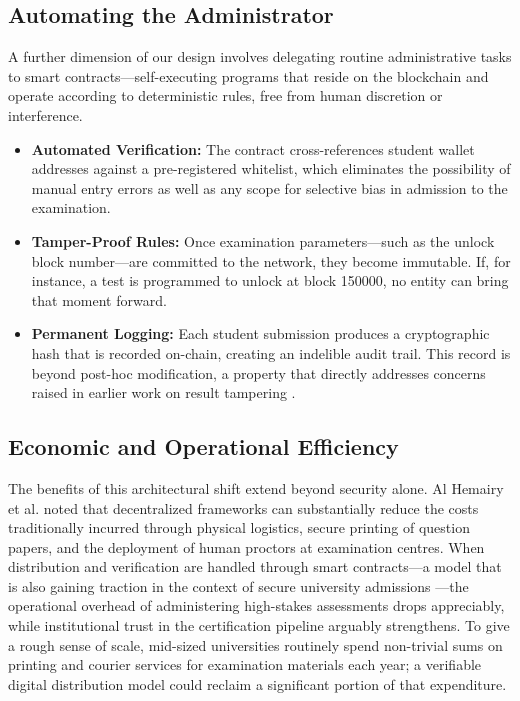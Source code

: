 \documentclass[final,5p,times]{elsarticle}
\begin{document}
\subsection{Automating the Administrator}
A further dimension of our design involves delegating routine administrative tasks to smart contracts—self-executing programs that reside on the blockchain and operate according to deterministic rules, free from human discretion or interference.
\begin{itemize}
    \item \textbf{Automated Verification:} The contract cross-references student wallet addresses against a pre-registered whitelist, which eliminates the possibility of manual entry errors as well as any scope for selective bias in admission to the examination.
    \item \textbf{Tamper-Proof Rules:} Once examination parameters—such as the unlock block number—are committed to the network, they become immutable. If, for instance, a test is programmed to unlock at block 150000, no entity can bring that moment forward.
    \item \textbf{Permanent Logging:} Each student submission produces a cryptographic hash that is recorded on-chain, creating an indelible audit trail. This record is beyond post-hoc modification, a property that directly addresses concerns raised in earlier work on result tampering \cite{samanta2021blockchain}.
\end{itemize}

\subsection{Economic and Operational Efficiency}
The benefits of this architectural shift extend beyond security alone. Al Hemairy et al. \cite{AlHemairy2024} noted that decentralized frameworks can substantially reduce the costs traditionally incurred through physical logistics, secure printing of question papers, and the deployment of human proctors at examination centres. When distribution and verification are handled through smart contracts—a model that is also gaining traction in the context of secure university admissions \cite{mori2020digital}—the operational overhead of administering high-stakes assessments drops appreciably, while institutional trust in the certification pipeline arguably strengthens. To give a rough sense of scale, mid-sized universities routinely spend non-trivial sums on printing and courier services for examination materials each year; a verifiable digital distribution model could reclaim a significant portion of that expenditure.
\end{document}
